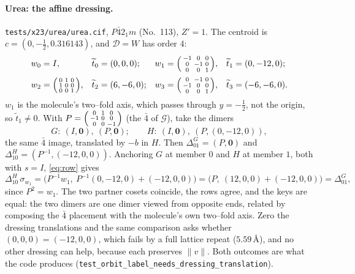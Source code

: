 \documentclass[11pt]{article}
\theoremstyle{definition}
\newcommand{\Grp}{\mathcal{G}}
\newcommand{\Dgrp}{\mathcal{D}}
\newcommand{\inv}{^{-1}}
\begin{document}
\paragraph{Urea: the affine dressing.} \texttt{tests/x23/urea/urea.cif},
$P\bar42_1m$ (No.~113), $Z'=1$. The centroid is $c=(0,-\tfrac12,0.316143)$, and
$\Dgrp=W$ has order $4$:
\[
\begin{array}{llll}
w_0=I, & \widetilde t_0=(0,0,0);
&w_1=\begin{psmallmatrix}-1&0&0\\0&-1&0\\0&0&1\end{psmallmatrix},
&\widetilde t_1=(0,-12,0);\\[2.2ex]
w_2=\begin{psmallmatrix}0&1&0\\1&0&0\\0&0&1\end{psmallmatrix},
&\widetilde t_2=(6,-6,0);
&w_3=\begin{psmallmatrix}0&-1&0\\-1&0&0\\0&0&1\end{psmallmatrix},
&\widetilde t_3=(-6,-6,0).
\end{array}
\]
$w_1$ is the molecule's two--fold axis, which passes through $y=-\tfrac12$, not
the origin, so $\widetilde t_1\ne0$. With
$P=\begin{psmallmatrix}0&1&0\\-1&0&0\\0&0&-1\end{psmallmatrix}$ (the $\bar4$ of
$\Grp$), take the dimers
\[
  G:\ (I,\mathbf 0),\ (P,\mathbf 0);\qquad
  H:\ (I,\mathbf 0),\ (P,(0,-12,0)),
\]
the same $\bar4$ image, translated by $-b$ in $H$. Then
$\Delta^G_{01}=(P,\mathbf 0)$ and $\Delta^H_{10}=(P\inv,(-12,0,0))$. Anchoring $G$
at member $0$ and $H$ at member $1$, both with $s=I$, \eqref{eq:row} gives
\[
  \Delta^H_{10}\,\sigma_{w_1}=\bigl(P\inv w_1,\ P\inv(0,-12,0)+(-12,0,0)\bigr)
  =\bigl(P,\ (12,0,0)+(-12,0,0)\bigr)=\Delta^G_{01},
\]
since $P^2=w_1$. The two partner cosets coincide, the rows agree, and the keys are
equal: the two dimers are one dimer viewed from opposite ends, related by
composing the $\bar4$ placement with the molecule's own two--fold axis. Zero the
dressing translations and the same comparison asks whether
$(0,0,0)=(-12,0,0)$, which fails by a full lattice repeat ($5.59$\,\AA), and no
other dressing can help, because each preserves $\lVert v\rVert$. Both outcomes
are what the code produces (\texttt{test\_orbit\_label\_needs\_dressing\_translation}).
\end{document}
